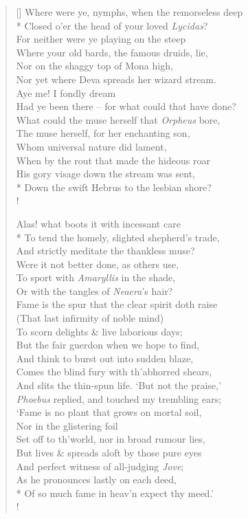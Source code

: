\documentclass[MAIN]{subfiles}
\begin{document}
\begin{verse}[\versewidth]
Where were ye, nymphs, when the remorseless deep\\*
Closed o'er the head of your loved \emph{Lycidas}?\\
For neither were ye playing on the steep\\
Where your old bards, the famous druids, lie,\\
Nor on the shaggy top of {\sc Mona} high,\\
Nor yet where {\sc Deva} spreads her wizard stream.\\
Aye me! I fondly dream\\
Had ye been there -- for what could that have done?\\
What could the muse herself that \emph{Orpheus} bore,\\
The muse herself, for her enchanting son,\\
Whom universal nature did lament,\\
When by the rout that made the hideous roar\\
His gory visage down the stream was sent,\\*
Down the swift {\sc Hebrus} to the lesbian shore?\\!

Alas! what boots it with incessant care\\*
To tend the homely, slighted shepherd's trade,\\
And strictly meditate the thankless muse?\\
Were it not better done, as others use,\\
To sport with \emph{Amaryllis} in the shade,\\
Or with the tangles of \emph{Neaera}'s hair?\\
Fame is the spur that the clear spirit doth raise\\
(That last infirmity of noble mind)\\
To scorn delights \& live laborious days;\\
But the fair guerdon when we hope to find,\\
And think to burst out into sudden blaze,\\
Comes the blind fury with th'abhorred shears,\\
And slits the thin-spun life. `But not the praise,'\\
\emph{Phoebus} replied, and touched my trembling ears;\\
`Fame is no plant that grows on mortal soil,\\
Nor in the glistering foil\\
Set off to th'world, nor in broad rumour lies,\\
But lives \& spreads aloft by those pure eyes\\
And perfect witness of all-judging \emph{Jove};\\
As he pronounces lastly on each deed,\\*
Of so much fame in heav'n expect thy meed.'\\!


\end{verse}
\end{document}
